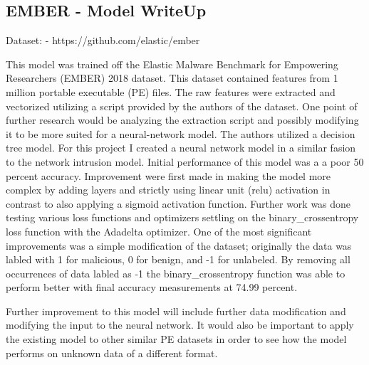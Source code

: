 \subsection{EMBER - Model WriteUp}
Dataset:
- https://github.com/elastic/ember\

This model was trained off the Elastic Malware Benchmark for Empowering Researchers (EMBER) 2018 dataset. This dataset contained features from 1 million portable executable (PE) files. The raw features were extracted and vectorized utilizing a script provided by the authors of the dataset. One point of further research would be analyzing the extraction script and possibly modifying it to be more suited for a neural-network model. The authors utilized a decision tree model. For this project I created a neural network model in a similar fasion to the network intrusion model. Initial performance of this model was a a poor 50 percent accuracy. Improvement were first made in making the model more complex by adding layers and strictly using linear unit (relu) activation in contrast to also applying a sigmoid activation function. Further work was done testing various loss functions and optimizers settling on the binary_crossentropy loss function with the Adadelta optimizer. One of the most significant improvements was a simple modification of the dataset; originally the data was labled with 1 for malicious, 0 for benign, and -1 for unlabeled. By removing all occurrences of data labled as -1 the binary_crossentropy function was able to perform better with final accuracy measurements at 74.99 percent.

Further improvement to this model will include further data modification and modifying the input to the neural network. It would also be important to apply the existing model to other similar PE datasets in order to see how the model performs on unknown data of a different format. 